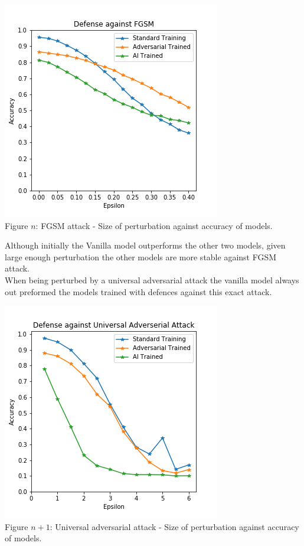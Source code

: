 \begin{center}
	\includegraphics[scale=0.5]{Advsarial_code/figures/doc_defense_against_FGSM.png}\\
	Figure $n$: FGSM attack - Size of perturbation against accuracy of models. 
\end{center}

Although initially the Vanilla model outperforms the other two models, given large enough perturbation the other models are more stable against FGSM attack.\\ 

When being perturbed by a universal adversarial attack the vanilla model always out preformed the models trained with defences against this exact attack. 

\begin{center}
	\includegraphics[scale=0.5]{Advsarial_code/figures/doc_defense_against_UAA.png}\\
	Figure $n + 1$: Universal adversarial attack - Size of perturbation against accuracy of models.
\end{center}

